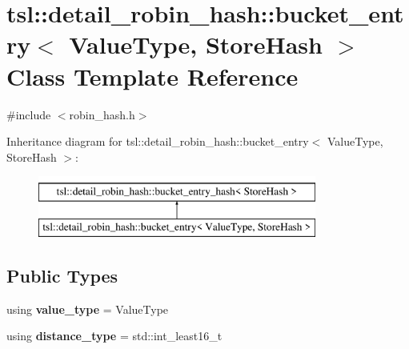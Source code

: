 \hypertarget{classtsl_1_1detail__robin__hash_1_1bucket__entry}{}\section{tsl\+::detail\+\_\+robin\+\_\+hash\+::bucket\+\_\+entry$<$ Value\+Type, Store\+Hash $>$ Class Template Reference}
\label{classtsl_1_1detail__robin__hash_1_1bucket__entry}


{\ttfamily \#include $<$robin\+\_\+hash.\+h$>$}

Inheritance diagram for tsl\+::detail\+\_\+robin\+\_\+hash\+::bucket\+\_\+entry$<$ Value\+Type, Store\+Hash $>$\+:\begin{figure}[H]
\begin{center}
\leavevmode
\includegraphics[height=2.000000cm]{classtsl_1_1detail__robin__hash_1_1bucket__entry}
\end{center}
\end{figure}
\subsection*{Public Types}
\begin{DoxyCompactItemize}
\item 
\mbox{\label{classtsl_1_1detail__robin__hash_1_1bucket__entry_a47ea807152a9961777b99cb42513935b}} 
using {\bfseries value\+\_\+type} = Value\+Type
\item 
\mbox{\label{classtsl_1_1detail__robin__hash_1_1bucket__entry_ad7620035b0efafd864a9627a9e610e8a}} 
using {\bfseries distance\+\_\+type} = std\+::int\+\_\+least16\+\_\+t
\end{DoxyCompactItemize}
